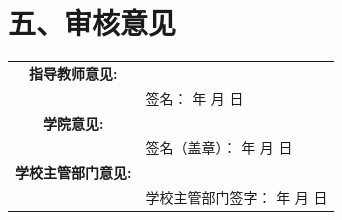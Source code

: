 \documentclass[a4paper,12pt]{ctexart}
\renewcommand{\arraystretch}{1.4}
\begin{document}
\section*{五、审核意见}
\begin{table}[h!]
    \centering
    \renewcommand{\arraystretch}{2.0}
    \begin{tabularx}{\textwidth}{|c|X|}
        \hline
        \textbf{指导教师意见:} &  \\
         & \hfill 签名：\hspace{4em} \newline \hfill 年 \quad 月 \quad 日 \\
        \hline
        \textbf{学院意见:} &  \\
         & \hfill 签名（盖章）：\hspace{4em} \newline \hfill 年 \quad 月 \quad 日 \\
        \hline
        \textbf{学校主管部门意见:} &  \\
         & \hfill 学校主管部门签字：\hspace{4em} \newline \hfill 年 \quad 月 \quad 日 \\
        \hline
    \end{tabularx}
\end{table}
\end{document}
